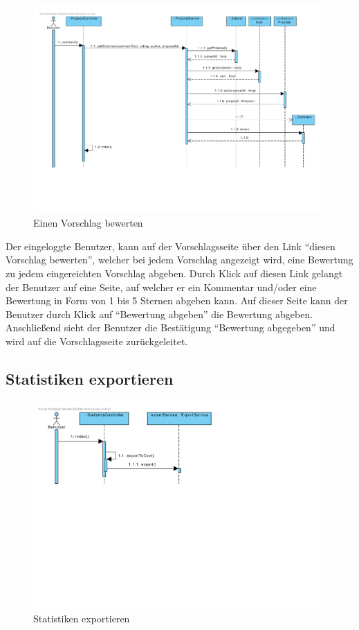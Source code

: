 \begin{figure}[H]
  \centering
  \includegraphics[width=\textwidth, clip]{gfx/vorschlag_bewerten}
  \caption{Einen Vorschlag bewerten}
\end{figure}

Der eingeloggte Benutzer, kann auf der Vorschlagsseite über den Link
``diesen Vorschlag bewerten'', welcher bei jedem Vorschlag angezeigt
wird, eine Bewertung zu jedem eingereichten Vorschlag abgeben. Durch
Klick auf diesen Link gelangt der Benutzer auf eine Seite, auf welcher
er ein Kommentar und/oder eine Bewertung in Form von 1 bis 5 Sternen
abgeben kann. Auf dieser Seite kann der Benutzer durch Klick auf
 ``Bewertung abgeben'' die Bewertung abgeben. Anschließend sieht
 der Benutzer die Bestätigung ``Bewertung abgegeben'' und wird auf die Vorschlagsseite zurückgeleitet.
 

\subsection{Statistiken exportieren}

\begin{figure}[H]
  \centering
  \includegraphics[width=\textwidth, clip]{gfx/statistiken_exportieren}
  \caption{Statistiken exportieren}
\end{figure}


